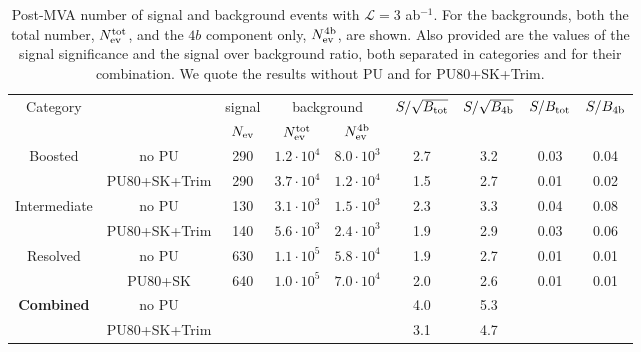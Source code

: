 \begin{table}[t]
  \centering
  \scriptsize
  \begin{tabular}{|c|c|c|c|c||c|c||c|c|}
        \hline
        Category  &  &  signal  &  \multicolumn{2}{c||}{background}     &
        $S/\sqrt{B_{\rm tot}}$ & $S/\sqrt{B_{\rm 4b}}$  
        &  $S/B_{\rm tot}$ & $S/B_{\rm 4b}$\\
         &  &  $N_{\rm ev}$  &  $N_{\rm ev}^{\rm tot}$  &  $N_{\rm ev}^{\rm 4b}$   &
         &     &   &  \\
    \hline
    \hline
    \multirow{2}{*}{Boosted} &  no PU  & 290  & $1.2\cdot 10^4$  &  $8.0\cdot 10^3$    & 
      2.7 &  3.2  & 0.03 & 0.04 \\
      & PU80+SK+Trim & 290  &$3.7\cdot 10^4$ & $1.2\cdot 10^4$     &  1.5  & 2.7 &  0.01 & 0.02   \\
    \hline
    \hline
    \multirow{2}{*}{Intermediate} &  no PU   & 130   & $3.1\cdot 10^3$  & $1.5\cdot 10^3$    &
    2.3  & 3.3  &  0.04  & 0.08   \\
    & PU80+SK+Trim & 140 & $5.6\cdot 10^3$   & $2.4\cdot 10^3$   & 1.9  & 2.9  & 0.03 & 0.06  \\
    \hline
    \hline
    \multirow{2}{*}{Resolved} &   no PU  & 630 & $1.1\cdot 10^5$   & $5.8\cdot 10^4$
    & 1.9  & 2.7  & 0.01 & 0.01 \\
    & PU80+SK & 640  & $1.0\cdot 10^5$   & $7.0\cdot 10^4$   & 2.0 & 2.6  & 0.01 & 0.01 \\
    \hline
    \hline
    \multirow{2}{*}{\bf Combined} &   no PU  &  \multicolumn{3}{c||}{} 
    &  4.0 & 5.3  &   \multicolumn{2}{c|}{}  \\
    & PU80+SK+Trim &    \multicolumn{3}{c||}{}    & 3.1  & 4.7  &  \multicolumn{2}{c|}{}  \\
    \hline
      \end{tabular}
  \caption{\small Post-MVA number of signal and background events
    with  $\mathcal{L}=3$ ab$^{-1}$.
    For the backgrounds, both the total number, $N_{\rm ev}^{\rm tot}$,
    and the  $4b$ 
    component only, $N_{\rm ev}^{\rm 4b}$, are shown.
    Also provided are the values of the signal 
    significance and the signal over background ratio,
    both separated in categories and for their combination.
    We quote the results without PU and for PU80+SK+Trim.
         \label{table:cutflowMVA_fakes}
  }
\end{table}

